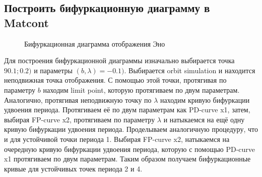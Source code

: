 \documentclass[12pt, a4paper]{article}
\begin{document}
\subsection{Построить бифуркационную диаграмму в Matcont}
\begin{figure}[H]
	\caption{Бифуркационная диаграмма отображения Эно}
\end{figure}

Для построения бифуркационной диаграммы изначально выбирается точка $90.1; 0.2)$ и параметры $(b, \lambda) = -0.1)$. Выбирается orbit simulation и находится неподвижная точка отображения. С помощью этой точки, протягивая по параметру $b$ находим limit point, которую протягиваем по двум параметрам. Аналогично, протягивая неподвижную точку по $\lambda$ находим кривую бифуркации удвоения периода. Протягиваем её по двум параметрам как PD-curve x1, затем, выбирая FP-curve x2, протягиваем по параметру $\lambda$ и натыкаемся на ещё одну кривую бифуркации удвоения периода. Проделываем аналогичную процедуру, что и для устойчивой точки периода 1. Выбирая FP-curve x2, натыкаемся на очередную кривую бифуркации удвоения периода, которую с помощью PD-curve x1 протягиваем по двум параметрам. Таким образом получаем бифуркационные кривые для устойчивых точек периода 2 и 4.
\end{document}
